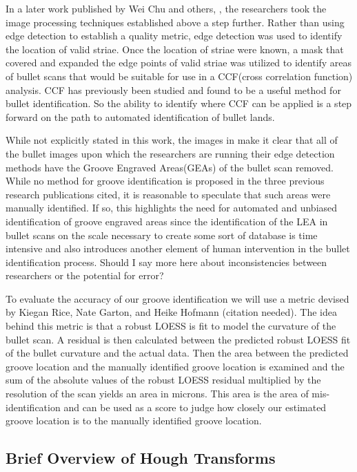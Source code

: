 \documentclass[12pt]{article}\usepackage[]{graphicx}\usepackage[]{color}
\theoremstyle{nonumberplain}
\begin{document}
In a later work published by Wei Chu and others, \cite{chu2013}, the researchers took the image processing techniques established above a step further. Rather than using edge detection to establish a quality metric, edge detection was used to identify the location of valid striae. Once the location of striae were known, a mask that covered and expanded the edge points of valid striae was utilized to identify areas of bullet scans that would be suitable for use in a CCF(cross correlation function) analysis. CCF has previously been studied \cite{chu2010-ccf} and found to be a useful method for bullet identification. So the ability to identify where CCF can be applied is a step forward on the path to automated identification of bullet lands.

While not explicitly stated in this work, the images in \cite{chu2013} make it clear that all of the bullet images upon which the researchers are running their edge detection methods have the Groove Engraved Areas(GEAs) of the bullet scan removed. While no method for groove identification is proposed in the three previous research publications cited, it is reasonable to speculate that such areas were manually identified. If so, this highlights the need for automated and unbiased identification of groove engraved areas since the identification of the LEA in bullet scans on the scale necessary to create some sort of database is time intensive and also introduces another element of human intervention in the bullet identification process. Should I say more here about inconsistencies between researchers or the potential for error? 

To evaluate the accuracy of our groove identification we will use a metric devised by Kiegan Rice, Nate Garton, and Heike Hofmann (citation needed). The idea behind this metric is that a robust LOESS is fit to model the curvature of the bullet scan. A residual is then calculated between the predicted robust LOESS fit of the bullet curvature and the actual data. Then the area between the predicted groove location and the manually identified groove location is examined and the sum of the absolute values of the robust LOESS residual multiplied by the resolution of the scan yields an area in microns. This area is the area of mis-identification and can be used as a score to judge how closely our estimated groove location is to the manually identified groove location. 


\subsection{Brief Overview of Hough Transforms}
\end{document}

